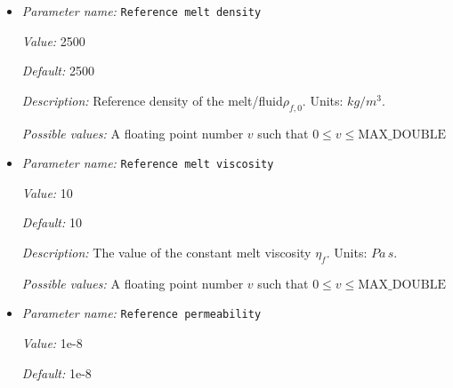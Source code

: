 \begin{itemize}
{\it Value:} 1e22


{\it Default:} 1e22


{\it Description:} The value of the constant bulk viscosity $\xi_0$ of the solid matrix. This viscosity may be modified by both temperature and porosity dependencies. Units: $Pa \, s$.


{\it Possible values:} A floating point number $v$ such that $0 \leq v \leq \text{MAX\_DOUBLE}$
\item {\it Parameter name:} {\tt Reference melt density}
\label{parameters:Material model/Melt global/Reference melt density}
\label{parameters:Material_20model/Melt_20global/Reference_20melt_20density}


{\it Value:} 2500


{\it Default:} 2500


{\it Description:} Reference density of the melt/fluid$\rho_{f,0}$. Units: $kg/m^3$.


{\it Possible values:} A floating point number $v$ such that $0 \leq v \leq \text{MAX\_DOUBLE}$
\item {\it Parameter name:} {\tt Reference melt viscosity}
\label{parameters:Material model/Melt global/Reference melt viscosity}
\label{parameters:Material_20model/Melt_20global/Reference_20melt_20viscosity}


{\it Value:} 10


{\it Default:} 10


{\it Description:} The value of the constant melt viscosity $\eta_f$. Units: $Pa \, s$.


{\it Possible values:} A floating point number $v$ such that $0 \leq v \leq \text{MAX\_DOUBLE}$
\item {\it Parameter name:} {\tt Reference permeability}
\label{parameters:Material model/Melt global/Reference permeability}
\label{parameters:Material_20model/Melt_20global/Reference_20permeability}


{\it Value:} 1e-8


{\it Default:} 1e-8



\end{itemize}
